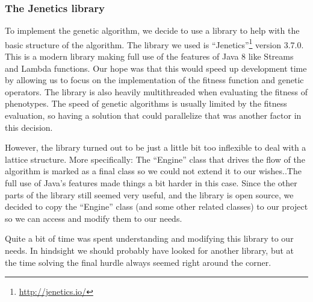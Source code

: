 \subsubsection{The Jenetics library}
To implement the genetic algorithm, we decide to use a library to help with the basic structure of the algorithm. The library we used is ``Jenetics''\footnote{\url{http://jenetics.io/}} version 3.7.0. This is a modern library making full use of the features of Java 8 like Streams and Lambda functions. Our hope was that this would speed up development time by allowing us to focus on the implementation of the fitness function and genetic operators. The library is also heavily multithreaded when evaluating the fitness of phenotypes. The speed of genetic algorithms is usually limited by the fitness evaluation, so having a solution that could parallelize that was another factor in this decision.
\par
However, the library turned out to be just a little bit too inflexible to deal with a lattice structure. More specifically: The ``Engine'' class that drives the flow of the algorithm is marked as a final class so we could not extend it to our wishes..The full use of Java's features made things a bit harder in this case. Since the other parts of the library still seemed very useful, and the library is open source, we decided to copy the ``Engine'' class (and some other related classes) to our project so we can access and modify them to our needs. 
\par
Quite a bit of time was spent understanding and modifying this library to our needs. In hindsight we should probably have looked for another library, but at the time solving the final hurdle always seemed right around the corner.
